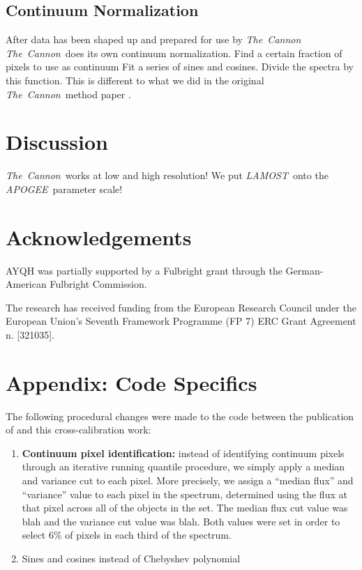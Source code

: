 \documentclass[12pt, preprint]{aastex}
\newcommand{\tc}{\textsl{The~Cannon}}
\newcommand{\apogee}{\textsl{APOGEE}}
\newcommand{\lamost}{\textsl{LAMOST}}
\begin{document}
\subsection{Continuum Normalization}

After data has been shaped up and prepared for use by \tc\, \tc\ does its own
continuum normalization. Find a certain fraction of pixels to use as continuum
Fit a series of sines and cosines. Divide the spectra by this function. This 
is different to what we did in the original \tc\ method paper \citep{ness2015}. 


\section{Discussion}

\tc\ works at low and high resolution! We put \lamost\ onto the \apogee\ 
parameter scale!

\section{Acknowledgements}

AYQH was partially supported by a Fulbright grant through the German-American
Fulbright Commission.

The research has received funding from the European Research Council under the 
European Union's Seventh Framework Programme (FP 7) ERC Grant Agreement n.
[321035].

\appendix
{}

\section{Appendix: Code Specifics}
\label{sec:appendix}

The following procedural changes were made to the code between the publication
of \citep{ness2015} and this cross-calibration work:

\begin{enumerate}
  \item \textbf{Continuum pixel identification:} instead of identifying
    continuum pixels through an iterative running quantile procedure, we 
    simply apply a median and variance cut to each pixel. More precisely,
    we assign a ``median flux'' and ``variance'' value to each pixel in the 
    spectrum, determined using the flux at that pixel across all of the 
    objects in the set. The median flux cut value was blah and the variance 
    cut value was blah. Both values were set in order to select 6\% of pixels 
    in each third of the spectrum. 
  \item Sines and cosines instead of Chebyshev polynomial
\end{enumerate}
\end{document}
